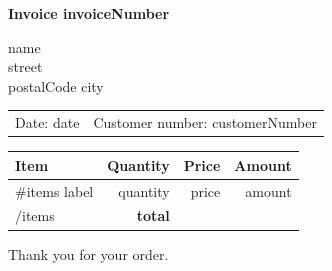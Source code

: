 \documentclass[11pt]{article}
\begin{document}
{\color{brand}\fontsize{20}{24}\selectfont\textbf{Invoice {{invoiceNumber}}}}

\bigskip
{{name}}\\
{{street}}\\
{{postalCode}} {{city}}

\bigskip
\begin{tabularx}{\textwidth}{Xr}
Date: {{date}} & Customer number: {{customerNumber}}\\
\end{tabularx}

\setlength{\LTleft}{0pt}
\setlength{\LTright}{0pt}
\begin{longtable}{@{}p{8cm}rrr@{}}
\toprule
\textbf{Item} & \textbf{Quantity} & \textbf{Price} & \textbf{Amount}\\
\midrule
\endhead
{{#items}}
{{label}} & {{quantity}} & {{price}} & {{amount}}\\
{{/items}}
\midrule
\arrayrulecolor{brand}
\multicolumn{3}{@{}l}{\textbf{Total}} & \textbf{{{total}}}\\
\bottomrule
\end{longtable}

\vfill
{\color{brand}\small Thank you for your order.}
\end{document}
